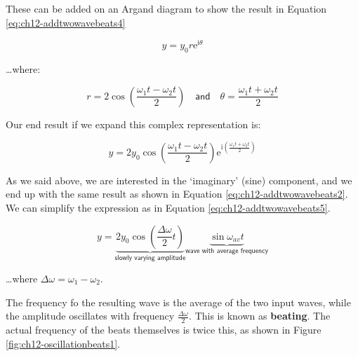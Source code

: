 \documentclass[
]{book}
\begin{document}
These can be added on an Argand diagram to show the result in Equation \eqref{eq:ch12-addtwowavebeats4}

\begin{equation}
y = y_0 r\mathrm{e}^{\mathrm{i}\theta}
\label{eq:ch12-addtwowavebeats4}
\end{equation}

\ldots where:

\begin{equation}
r = 2 \cos\left(\frac{\omega_1t - \omega_2t}{2}\right) \quad \textsf{and} \quad \theta = \frac{\omega_1 t + \omega_2 t}{2}
\end{equation}

Our end result if we expand this complex representation is:

\begin{equation}
y = 2 y_0 \cos \left( \frac{\omega_1t - \omega_2t}{2} \right) \mathrm{e}^{\mathrm{i}\left(\frac{\omega_1 t + \omega_2t}{2} \right)}
\end{equation}

As we said above, we are interested in the `imaginary' (sine) component, and we end up with the same result as shown in Equation \eqref{eq:ch12-addtwowavebeats2}. We can simplify the expression as in Equation \eqref{eq:ch12-addtwowavebeats5}.

\begin{equation}
y = \underbrace{ 2y_{0} \cos \left( \frac{\Delta \omega}{2}t \right)}_{\textsf{slowly varying amplitude}} \underbrace{ \sin \omega_{av}t}_{\textsf{wave with average frequency}}
\end{equation}

\ldots where \(\Delta \omega = \omega_1 - \omega_2\).

The frequency fo the resulting wave is the average of the two input waves, while the amplitude oscillates with frequency \(\frac{\Delta \omega}{2}\). This is known as \textbf{beating}. The actual frequency of the beats themselves is twice this, as shown in Figure \ref{fig:ch12-oscillationbeats1}.
\end{document}

